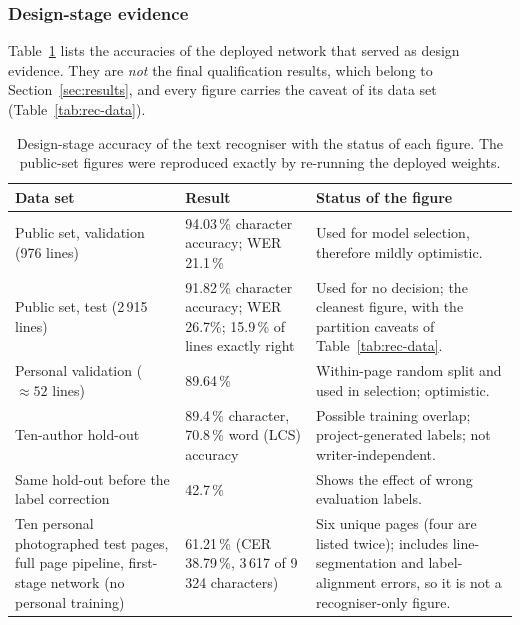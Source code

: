 \subsubsection{Design-stage evidence}

Table~\ref{tab:rec-results} lists the accuracies of the deployed network that served as design evidence.
They are \emph{not} the final qualification results, which belong to Section~\ref{sec:results}, and every figure carries the caveat of its data set (Table~\ref{tab:rec-data}).

\begin{table}[h]
\centering
\fontsize{9.5}{11.5}\selectfont
\begin{tabularx}{\linewidth}{|p{3.7cm}|p{2.7cm}|X|}
\hline
\textbf{Data set} & \textbf{Result} & \textbf{Status of the figure} \\
\hline
Public set, validation (976 lines) & 94.03\,\% character accuracy; WER 21.1\,\% & Used for model selection, therefore mildly optimistic. \\
\hline
Public set, test (2\,915 lines) & 91.82\,\% character accuracy; WER 26.7\%; 15.9\,\% of lines exactly right & Used for no decision; the cleanest figure, with the partition caveats of Table~\ref{tab:rec-data}. \\
\hline
Personal validation ($\approx52$ lines) & 89.64\,\% & Within-page random split and used in selection; optimistic. \\
\hline
Ten-author hold-out & 89.4\,\% character, 70.8\,\% word (LCS) accuracy & Possible training overlap; project-generated labels; not writer-independent. \\
\hline
Same hold-out before the label correction & 42.7\,\% & Shows the effect of wrong evaluation labels. \\
\hline
Ten personal photographed test pages, full page pipeline, first-stage network (no personal training) & 61.21\,\% (CER 38.79\,\%, 3\,617 of 9\,324 characters) & Six unique pages (four are listed twice); includes line-segmentation and label-alignment errors, so it is not a recogniser-only figure. \\
\hline
\end{tabularx}
\caption{Design-stage accuracy of the text recogniser with the status of each figure. The public-set figures were reproduced exactly by re-running the deployed weights.}
\label{tab:rec-results}
\end{table}


